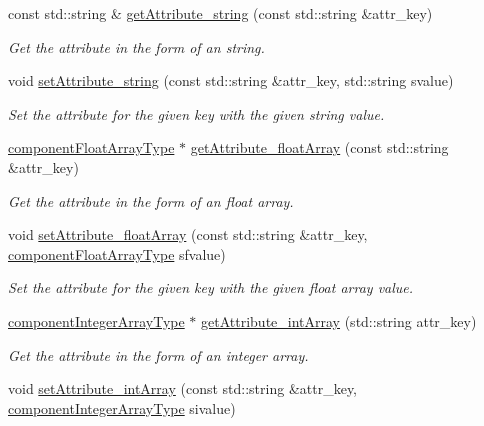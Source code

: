 \begin{DoxyCompactItemize}
const std\-::string \& \hyperlink{class_abstract_component_a4140957094ef40c4ffaa0ef381d00ce5}{get\-Attribute\-\_\-string} (const std\-::string \&attr\-\_\-key)
\begin{DoxyCompactList}\small\item\em Get the attribute in the form of an string. \end{DoxyCompactList}\item 
void \hyperlink{class_abstract_component_a702ec2cc2624561ef51afcd9c8061fd2}{set\-Attribute\-\_\-string} (const std\-::string \&attr\-\_\-key, std\-::string svalue)
\begin{DoxyCompactList}\small\item\em Set the attribute for the given key with the given string value. \end{DoxyCompactList}\item 
\hyperlink{_abstract_component_8h_a55cf170262c3d7123f8b95208293e36d}{component\-Float\-Array\-Type} $\ast$ \hyperlink{class_abstract_component_a7289cf7b6f2bfdb9819f3cf337af9845}{get\-Attribute\-\_\-float\-Array} (const std\-::string \&attr\-\_\-key)
\begin{DoxyCompactList}\small\item\em Get the attribute in the form of an float array. \end{DoxyCompactList}\item 
void \hyperlink{class_abstract_component_a8829d475d858bc03e3e3be0e18f18fdb}{set\-Attribute\-\_\-float\-Array} (const std\-::string \&attr\-\_\-key, \hyperlink{_abstract_component_8h_a55cf170262c3d7123f8b95208293e36d}{component\-Float\-Array\-Type} sfvalue)
\begin{DoxyCompactList}\small\item\em Set the attribute for the given key with the given float array value. \end{DoxyCompactList}\item 
\hyperlink{_abstract_component_8h_a8bf1376a7e433919172c6631520f34b4}{component\-Integer\-Array\-Type} $\ast$ \hyperlink{class_abstract_component_a666015a89f6e5fbf07395f652df99f7e}{get\-Attribute\-\_\-int\-Array} (std\-::string attr\-\_\-key)
\begin{DoxyCompactList}\small\item\em Get the attribute in the form of an integer array. \end{DoxyCompactList}\item 
void \hyperlink{class_abstract_component_a309929ad461fc269cc21485a92e211d3}{set\-Attribute\-\_\-int\-Array} (const std\-::string \&attr\-\_\-key, \hyperlink{_abstract_component_8h_a8bf1376a7e433919172c6631520f34b4}{component\-Integer\-Array\-Type} sivalue)

\end{DoxyCompactItemize}
